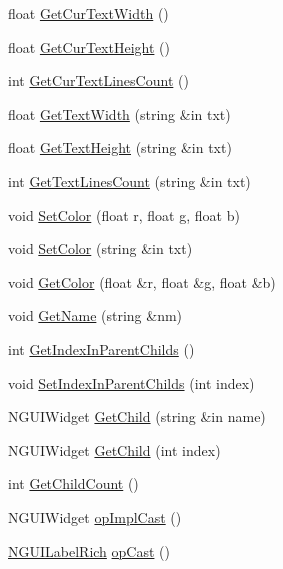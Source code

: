 \begin{DoxyCompactItemize}
float \hyperlink{class_n_g_u_i_label_rich_aedefb4e30103099e3bc3ef241af15dde}{Get\+Cur\+Text\+Width} ()
\item 
float \hyperlink{class_n_g_u_i_label_rich_aae131d8f53c9c3430b00dee0738b6734}{Get\+Cur\+Text\+Height} ()
\item 
int \hyperlink{class_n_g_u_i_label_rich_a2a255b85dfe33461fa01b31f4712e39e}{Get\+Cur\+Text\+Lines\+Count} ()
\item 
float \hyperlink{class_n_g_u_i_label_rich_a54b2126858fcb89e1fc4d99b1c89d1aa}{Get\+Text\+Width} (string \&in txt)
\item 
float \hyperlink{class_n_g_u_i_label_rich_aec81e673ec89b7050f8d73b6f0185c54}{Get\+Text\+Height} (string \&in txt)
\item 
int \hyperlink{class_n_g_u_i_label_rich_a3698b06a05b2c47e0b4123dd7dd9eb42}{Get\+Text\+Lines\+Count} (string \&in txt)
\item 
void \hyperlink{class_n_g_u_i_label_rich_a326a7fa95ac1f0d58b8176ee151e41ba}{Set\+Color} (float r, float g, float b)
\item 
void \hyperlink{class_n_g_u_i_label_rich_a1619f5a152ba7debff53d618e23e16c1}{Set\+Color} (string \&in txt)
\item 
void \hyperlink{class_n_g_u_i_label_rich_a2619e4f3e612b2c18ca2ee27ce37552b}{Get\+Color} (float \&r, float \&g, float \&b)
\item 
void \hyperlink{class_n_g_u_i_label_rich_a6e99038527a6d412f8ba1797eb4eae94}{Get\+Name} (string \&nm)
\item 
int \hyperlink{class_n_g_u_i_label_rich_a6d5bb615650cdafac4155c40e2673a70}{Get\+Index\+In\+Parent\+Childs} ()
\item 
void \hyperlink{class_n_g_u_i_label_rich_a3c61f1daf731fb1534634f41f75022fd}{Set\+Index\+In\+Parent\+Childs} (int index)
\item 
N\+G\+U\+I\+Widget \hyperlink{class_n_g_u_i_label_rich_a23f37ba6fdc4469be27c94e27536ea67}{Get\+Child} (string \&in name)
\item 
N\+G\+U\+I\+Widget \hyperlink{class_n_g_u_i_label_rich_a9af08bfc73ae701b01e7312343ce29de}{Get\+Child} (int index)
\item 
int \hyperlink{class_n_g_u_i_label_rich_abbb54952e35bfb90369b87ede9d3bc57}{Get\+Child\+Count} ()
\item 
N\+G\+U\+I\+Widget \hyperlink{class_n_g_u_i_label_rich_a3c181db8a6bf0668541b6e47ac04150a}{op\+Impl\+Cast} ()
\item 
\hyperlink{class_n_g_u_i_label_rich}{N\+G\+U\+I\+Label\+Rich} \hyperlink{class_n_g_u_i_label_rich_ac2ae816b666180bf9ff0619dee60e200}{op\+Cast} ()

\end{DoxyCompactItemize}
